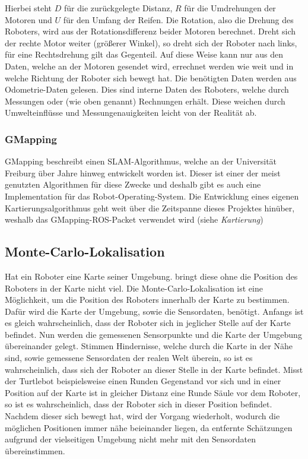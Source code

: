 {{{			Hierbei steht $D$ für die zurückgelegte Distanz, $R$ für die Umdrehungen der Motoren und $U$ für den Umfang der Reifen. Die Rotation, also die Drehung des Roboters, wird aus der Rotationsdifferenz beider Motoren berechnet. Dreht sich der rechte Motor weiter (größerer Winkel), so dreht sich der Roboter nach links, für eine Rechtsdrehung gilt das Gegenteil.
			Auf diese Weise kann nur aus den Daten, welche an der Motoren gesendet wird, errechnet werden wie weit und in welche Richtung der Roboter sich bewegt hat.
			Die benötigten Daten werden aus Odometrie-Daten gelesen. Dies sind interne Daten des Roboters, welche durch Messungen oder (wie oben genannt) Rechnungen erhält. Diese weichen durch Umwelteinflüsse und Messungenauigkeiten leicht von der Realität ab.
			
			
		\subsubsection{GMapping}
		{
			GMapping beschreibt einen SLAM-Algorithmus, welche an der Universität Freiburg über Jahre hinweg entwickelt worden ist. Dieser ist einer der  meist genutzten Algorithmen für diese Zwecke und deshalb gibt es auch eine Implementation für das Robot-Operating-System. Die Entwicklung eines eigenen Kartierungsalgorithmus geht weit über die Zeitspanne dieses Projektes hinüber, weshalb das GMapping-ROS-Packet verwendet wird (siehe \textit{Kartierung}) %
			
		}
	}

	\subsection{Monte-Carlo-Lokalisation}
	{ 
		Hat ein Roboter eine Karte seiner Umgebung. bringt diese ohne die Position des Roboters in der Karte nicht viel. Die Monte-Carlo-Lokalisation ist eine Möglichkeit, um die Position des Roboters innerhalb der Karte zu bestimmen.  Dafür wird die Karte der Umgebung, sowie die Sensordaten, benötigt. Anfangs ist es gleich wahrscheinlich, dass der Roboter sich in jeglicher Stelle auf der Karte befindet. Nun werden die gemessenen Sensorpunkte und die Karte der Umgebung übereinander gelegt. Stimmen Hindernisse, welche durch die Karte in der Nähe sind, sowie gemessene Sensordaten der realen Welt überein, so ist es wahrscheinlich, dass sich der Roboter an dieser Stelle in der Karte befindet. Misst der Turtlebot beispielsweise einen Runden Gegenstand vor sich und in einer Position auf der Karte ist in gleicher Distanz eine Runde Säule vor dem Roboter, so ist es wahrscheinlich, dass der Roboter sich in dieser Position befindet. Nachdem dieser sich bewegt hat, wird der Vorgang wiederholt, wodurch die möglichen Positionen immer nähe beieinander liegen, da entfernte Schätzungen aufgrund der vielseitigen Umgebung nicht mehr mit den Sensordaten übereinstimmen. 
	}
}}
